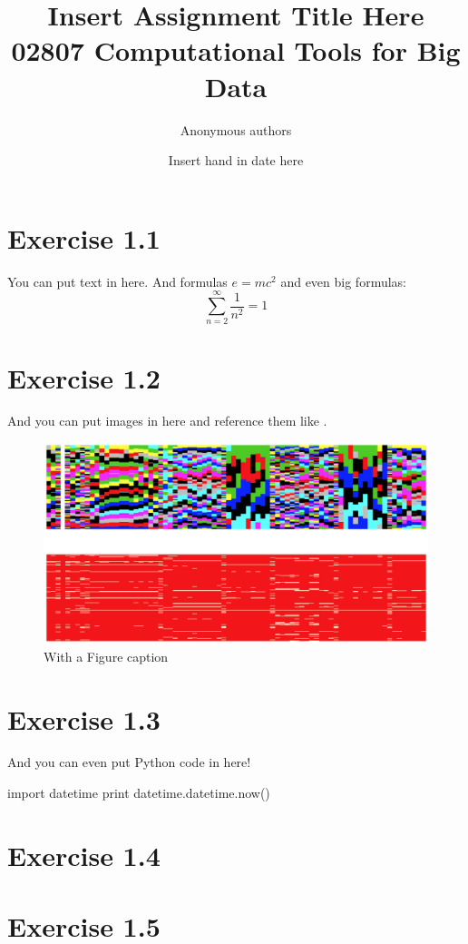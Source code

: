 \documentclass{article}
\title{Insert Assignment Title Here\\02807 Computational Tools for Big Data}
\author{Anonymous authors}
\date{Insert hand in date here}
\begin{document}
\maketitle

\section{Exercise 1.1}
You can put text in here. And formulas $e=mc^2$ and even big formulas:
\[
\sum_{n=2}^{\infty} \frac{1}{n^2} = 1
\]

\section{Exercise 1.2}
And you can put images in here and reference them like .

\begin{figure}[!h]
\centering
\includegraphics[width=\textwidth]{image.png}
\caption{With a Figure caption}
\label{fig:my_label}
\end{figure}


\section{Exercise 1.3}
And you can even put Python code in here!

\begin{python}
import datetime
print datetime.datetime.now()
\end{python}


\section{Exercise 1.4}
\section{Exercise 1.5}
\end{document}
